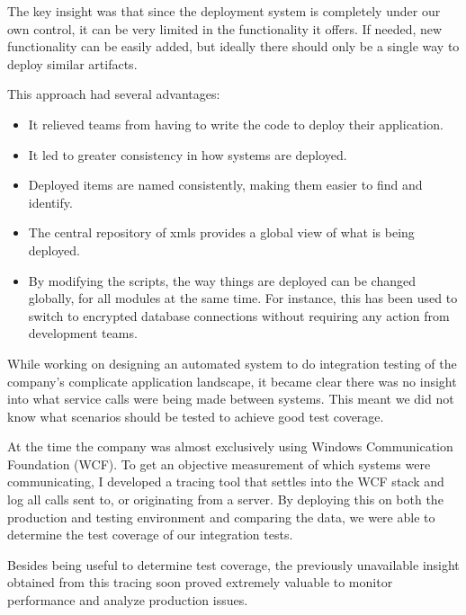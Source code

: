 \documentclass[10pt,a4paper]{../altacv}
\begin{document}
\begin{fullwidth}
\medskip\medskip

The key insight was that since the deployment system is completely under our own control, it can be very limited in the functionality it offers. If needed, new functionality can be easily added, but ideally there should only be a single way to deploy similar artifacts.

\medskip\medskip

This approach had several advantages:

\medskip

\begin{itemize}
\item\small It relieved teams from having to write the code to deploy their application.
\item\small It led to greater consistency in how systems are deployed.
\item\small Deployed items are named consistently, making them easier to find and identify.
\item\small The central repository of xmls provides a global view of what is being deployed.
\item\small By modifying the scripts, the way things are deployed can be changed globally, for all modules at the same time. For instance, this has been used to switch to encrypted database connections without requiring any action from development teams.
\end{itemize}

\bigskip\bigskip

While working on designing an automated system to do integration testing of the company’s complicate application landscape, it became clear there was no insight into what service calls were being made between systems. This meant we did not know what scenarios should be tested to achieve good test coverage.

\medskip\medskip

At the time the company was almost exclusively using Windows Communication Foundation (WCF). To get an objective measurement of which systems were communicating, I developed a tracing tool that settles into the WCF stack and log all calls sent to, or originating from a server. By deploying this on both the production and testing environment and comparing the data, we were able to determine the test coverage of our integration tests.

\medskip\medskip

Besides being useful to determine test coverage, the previously unavailable insight obtained from this tracing soon proved extremely valuable to monitor performance and analyze production issues.


\end{fullwidth}
\end{document}

